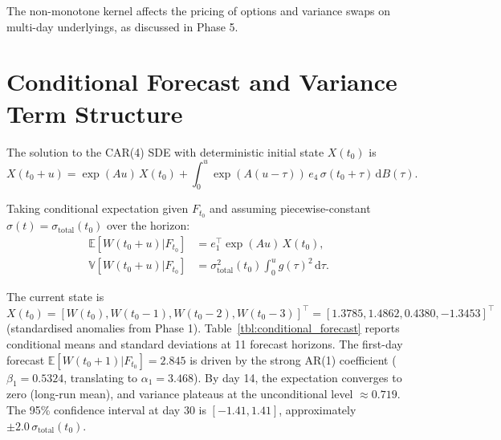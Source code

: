 \documentclass[11pt, a4paper, twoside]{article}
\begin{document}
The non-monotone kernel affects the pricing of options and variance swaps on multi-day underlyings, as discussed in Phase 5.

\section{Conditional Forecast and Variance Term Structure}

The solution to the CAR(4) SDE with deterministic initial state $X(t_0)$ is
\begin{equation}
X(t_0+u) = \exp(Au) \, X(t_0) + \int_0^u \exp(A(u-\tau)) \, e_4 \, \sigma(t_0+\tau) \, \mathrm{d}B(\tau).
\end{equation}

Taking conditional expectation given $F_{t_0}$ and assuming piecewise-constant $\sigma(t) = \sigma_{\text{total}}(t_0)$ over the horizon:
\begin{align}
\mathbb{E}[W(t_0+u)|F_{t_0}] &= e_1^{\top} \exp(Au) \, X(t_0), \\
\mathbb{V}[W(t_0+u)|F_{t_0}] &= \sigma^2_{\text{total}}(t_0) \int_0^u g(\tau)^2 \, \mathrm{d}\tau.
\end{align}

The current state is $X(t_0) = [W(t_0), W(t_0-1), W(t_0-2), W(t_0-3)]^{\top} = [1.3785, 1.4862, 0.4380, -1.3453]^{\top}$ (standardised anomalies from Phase 1). Table~\ref{tbl:conditional_forecast} reports conditional means and standard deviations at 11 forecast horizons. The first-day forecast $\mathbb{E}[W(t_0+1)|F_{t_0}] = 2.845$ is driven by the strong AR(1) coefficient ($\beta_1 = 0.5324$, translating to $\alpha_1 = 3.468$). By day 14, the expectation converges to zero (long-run mean), and variance plateaus at the unconditional level $\approx 0.719$. The 95\% confidence interval at day 30 is $[-1.41, 1.41]$, approximately $\pm 2.0 \, \sigma_{\text{total}}(t_0)$.
\end{document}
